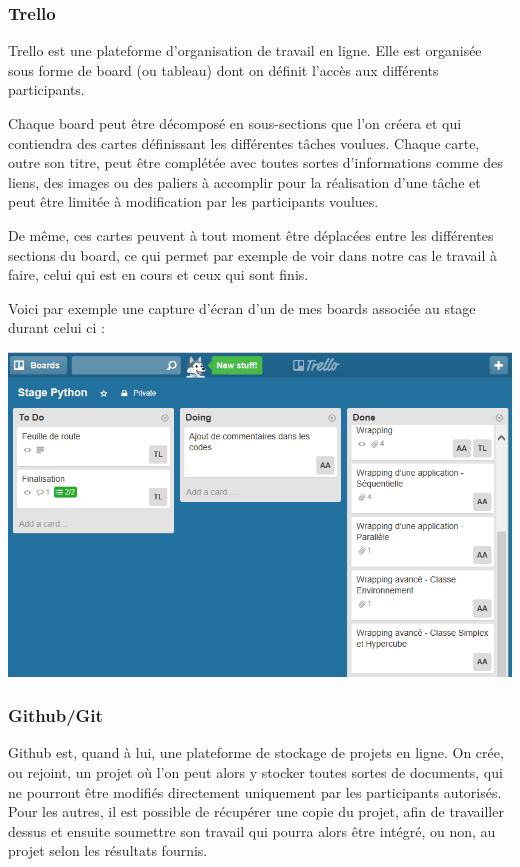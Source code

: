 \documentclass[french,12pt]{article}
\begin{document}
\subsubsection{Trello}

Trello est une plateforme d'organisation de travail en ligne. Elle est organisée sous forme de board (ou tableau) dont on définit l'accès aux différents participants.
\newline

Chaque board peut être décomposé en sous-sections que l'on créera et qui contiendra des cartes définissant les différentes tâches voulues.
Chaque carte, outre son titre, peut être complétée avec toutes sortes d'informations comme des liens, des images ou des paliers à accomplir pour la réalisation d'une tâche et peut être limitée à modification par les participants voulues.
\newline

De même, ces cartes peuvent à tout moment être déplacées entre les différentes sections du board, ce qui permet par exemple de voir dans notre cas le travail à faire, celui qui est en cours et ceux qui sont finis.
\newline

Voici par exemple une capture d'écran d'un de mes boards associée au stage durant celui ci :

\includegraphics[scale=0.55]{1.png} 

\subsubsection{Github/Git}

Github est, quand à lui, une plateforme de stockage de projets en ligne. On crée, ou rejoint, un projet où l'on peut alors y stocker toutes sortes de documents, qui ne pourront être modifiés directement uniquement par les participants autorisés. 
Pour les autres, il est possible de récupérer une copie du projet, afin de travailler dessus et ensuite soumettre son travail qui pourra alors être intégré, ou non, au projet selon les résultats fournis.
\newline
\end{document}
